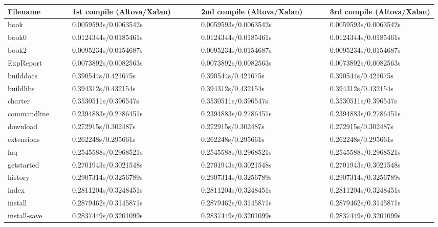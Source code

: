 \documentclass[letterpaper,10pt,titlepage]{article}
\begin{document}
\begin{longtable}{ | p{0.15\linewidth} | p{0.3\linewidth} | p{0.3\linewidth} | p{0.3\linewidth} |}\hline
  Filename & 1st compile (Altova/Xalan) & 2nd compile (Altova/Xalan) & 3rd compile (Altova/Xalan)  \\ \hline
  	book &
    0.0059593s/0.0063542s &
    0.0059593s/0.0063542s &
    0.0059593s/0.0063542s   \\
  \hline
  	book0 &
    0.0124344s/0.0185461s &
    0.0124344s/0.0185461s &
    0.0124344s/0.0185461s\\
  \hline
    book2 &
    0.0095234s/0.0154687s &
    0.0095234s/0.0154687s &
    0.0095234s/0.0154687s\\
    \hline
    ExpReport &
    0.0073892s/0.0082563s &
    0.0073892s/0.0082563s &
    0.0073892s/0.0082563s\\
    \hline
    builddocs &
    0.390544s/0.421675s &
    0.390544s/0.421675s &
    0.390544s/0.421675s \\
    \hline
    buildlibs &
    0.394312s/0.432154s &
    0.394312s/0.432154s &
    0.394312s/0.432154s \\
    \hline
    charter &
    0.3530511s/0.396547s &
    0.3530511s/0.396547s &
    0.3530511s/0.396547s \\
    \hline
    commandline &
    0.2394883s/0.2786451s &
    0.2394883s/0.2786451s &
    0.2394883s/0.2786451s \\
    \hline
    download &
    0.272915s/0.302487s &
    0.272915s/0.302487s &
    0.272915s/0.302487s \\
    \hline
    extensions &
    0.262248s/0.295661s &
    0.262248s/0.295661s &
    0.262248s/0.295661s \\
    \hline
    faq &
    0.2545588s/0.2968521s &
    0.2545588s/0.2968521s &
    0.2545588s/0.2968521s \\
    \hline
    getstarted &
    0.2701943s/0.3021548s &
    0.2701943s/0.3021548s &
    0.2701943s/0.3021548s \\
    \hline
    history &
    0.2907314s/0.3256789s &
    0.2907314s/0.3256789s &
    0.2907314s/0.3256789s \\
    \hline
    index &
    0.2811204s/0.3248451s &
    0.2811204s/0.3248451s &
    0.2811204s/0.3248451s \\
    \hline
    install &
    0.2879462s/0.3145871s &
    0.2879462s/0.3145871s &
    0.2879462s/0.3145871s \\
    \hline
    install-save &
    0.2837449s/0.3201099s &
    0.2837449s/0.3201099s &
    0.2837449s/0.3201099s \\

\end{longtable}
\end{document}
